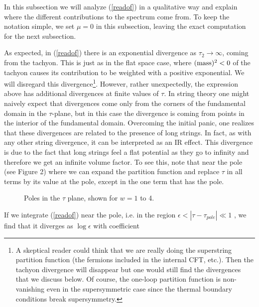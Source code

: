 In this subsection we will analyze (\ref{readof}) in a qualitative way and
explain where the different contributions to the spectrum come from. To 
keep the notation simple, we set $\mu=0$ in this subsection, leaving
the exact computation for the next subsection.

As expected, in (\ref{readof}) there is an exponential divergence as $\tau_2
\rightarrow \infty$, coming from the tachyon.  This is just as in the flat
space case, where $({\rm mass})^2 < 0$ of the tachyon causes its
contribution to be weighted with a positive exponential. We will disregard
this divergence\footnote{
A skeptical reader could think that we are really doing
the superstring partition function (the fermions included in 
the internal CFT, etc.).
Then  the tachyon divergence will disappear but one would still 
find the divergences that we discuss below. Of course, the one-loop
partition function is non-vanishing even in the supersymmetric case since
the thermal boundary conditions break supersymmetry.}.   
However, rather unexpectedly,  the
expression above has additional divergences at finite values of $\tau$.
In string theory one might naively expect that divergences come only
from the corners of the fundamental domain in the $\tau$-plane, 
but in this case the divergence is 
coming from points  in the interior of the fundamental domain. 
Overcoming the initial panic, one realizes that these divergences are
related to the presence of long strings. In fact, as with any other
string divergence, it can be interpreted as an IR effect. This divergence
is due to the fact that long strings feel a flat potential as they go to 
infinity and therefore we get an infinite volume factor. 
To see this, note that near the pole (see Figure 2)
where
we can expand the partition function and replace $\tau$ in  all terms by its
value at the pole, except in the one term  that has the pole.  
\begin{figure}[htb]
\begin{center}
\epsfxsize=3.0in\leavevmode{}
\end{center}
\caption{Poles in the $\tau$ plane, shown for $w=1$ to 4.}
\label{fig:fig1}
\end{figure} 
If we integrate (\ref{readof}) near the pole, i.e. in the region
  $ \epsilon < | \tau - \tau_{pole}| \ll 1 $ , we find that it
diverges as $\log \epsilon$ with coefficient  
